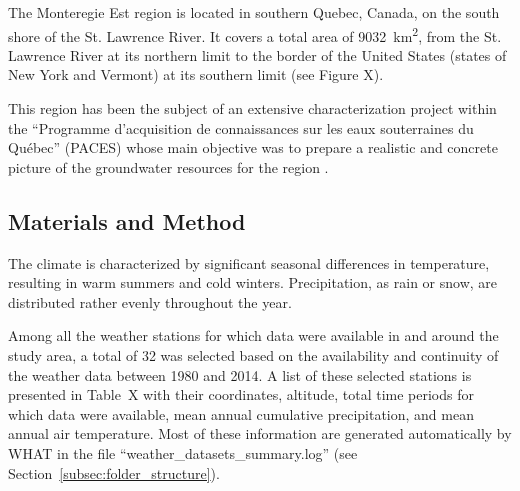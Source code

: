 \documentclass[WHATMANUAL.tex]{subfiles}
\begin{document}
The Monteregie Est region is located in southern Quebec, Canada, on the south shore of the St. Lawrence River. It covers a total area of 9032~km\textsuperscript{2}, from the St. Lawrence River at its northern limit to the border of the United States (states of New York and Vermont) at its southern limit (see Figure X).

This region has been the subject of an extensive characterization project within the ``Programme d'acquisition de connaissances sur les eaux souterraines du Québec'' (PACES) whose main objective was to prepare a realistic and concrete picture of the groundwater resources for the region \citep{carrier_portrait_2013}.

\subsection{Materials and Method}


The climate is characterized by significant seasonal differences in temperature, resulting in warm summers and cold winters. Precipitation, as rain or snow, are distributed rather evenly throughout the year.

Among all the weather stations for which data were available in and around the study area, a total of 32 was selected based on the availability and continuity of the weather data between 1980 and 2014. A list of these selected stations is presented in Table~X with their coordinates, altitude, total time periods for which data were available, mean annual cumulative precipitation, and mean annual air temperature. Most of these information are generated automatically by WHAT in the file ``weather\_datasets\_summary.log'' (see Section~\ref{subsec:folder_structure}).
\end{document}
